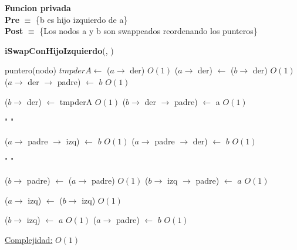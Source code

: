 \begin{Algoritmos}
\begin{algorithm}[H]
\begin{algorithmic}[1]
\end{algorithmic}
\end{algorithm}

$ $\newline



$ $\newline

\textbf{Funcion privada}\\
\textbf{Pre} $\equiv$ \{b es hijo izquierdo de a\}\\%
\textbf{Post} $\equiv$ \{Los nodos a y b son swappeados reordenando los punteros\}%
\begin{algorithm}[H]
{\textbf{iSwapConHijoIzquierdo}(, )}
\begin{algorithmic}[1]

    \State puntero(nodo) $tmpderA \gets$ ($a \to$ der) \Comment $O(1)$
    \State ($a \to$ der) $\gets$ ($b \to$ der)  \Comment $O(1)$
        \State ($a \to$ der $\to$ padre) $\gets$ $b$ \Comment $O(1)$
    \EndIf

    \State ($b \to$ der) $\gets$ tmpderA  \Comment $O(1)$
        \State ($b \to$ der $\to$ padre) $\gets$ a  \Comment $O(1)$
    \EndIf
    
    \State " "

        \State ($a \to$ padre $\to$ izq) $\gets$ $b$ \Comment $O(1)$
    \Else {}
        \State ($a \to$ padre $\to$ der) $\gets$ $b$ \Comment $O(1)$
    \EndIf
    \EndIf
    
    \State " "

    \State ($b \to$ padre) $\gets$ ($a \to$ padre) \Comment $O(1)$
        \State ($b \to$ izq $\to$ padre) $\gets$ $a$ \Comment $O(1)$
    \EndIf
    
    \State ($a \to$ izq) $\gets$ ($b \to$ izq) \Comment $O(1)$
    
    \State ($b \to$ izq) $\gets$ $a$ \Comment $O(1)$
    \State ($a \to$ padre) $\gets$ $b$ \Comment $O(1)$





    \medskip
    \Statex \underline{Complejidad:} $O(1)$

\end{algorithmic}
\end{algorithm}


\end{Algoritmos}
